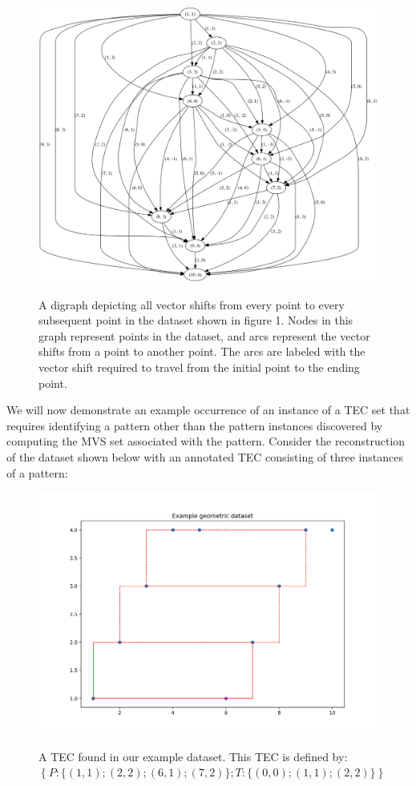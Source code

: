 \documentclass[12pt]{article}
\begin{document}
\FloatBarrier
\begin{figure}[!htbp]
  \centering
  \includegraphics[width=\textwidth]{optimal_check}
  \label{fig:figure2}
  \caption{A digraph depicting all vector shifts from every point to every subsequent point in the dataset shown in figure 1. Nodes in this graph represent points in the dataset, and arcs represent the vector shifts from a point to another point. The arcs are labeled with the vector shift required to travel from the initial point to the ending point.}
\end{figure}
\FloatBarrier

We will now demonstrate an example occurrence of an instance of a TEC set that requires identifying a pattern other than the pattern instances discovered by computing the MVS set associated with the pattern. Consider the reconstruction of the dataset shown below with an annotated TEC consisting of three instances of a pattern:

\FloatBarrier
\begin{figure}[!htbp]
  \centering
  \includegraphics[width=.8\textwidth]{annotated_data_example}
  \label{fig:figure3}
  \caption{A TEC found in our example dataset. This TEC is defined by: $\left\{ P:\{(1, 1); (2, 2); (6, 1); (7, 2)\}; T: \{(0, 0); (1, 1); (2, 2)\} \right\}$}
\end{figure}
\FloatBarrier
\end{document}
